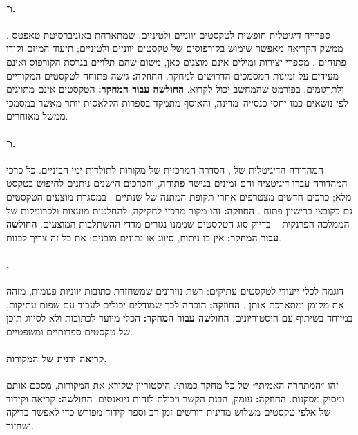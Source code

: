 \paragraph{ ו־.} ספרייה דיגיטלית חופשית לטקסטים יווניים ולטיניים, שמתארחת באוניברסיטת טאפטס \cite{perseus_scaife}. ממשק הקריאה  מאפשר שימוש בקורפוסים של טקסטים יווניים ולטיניים; תיעוד המיזם וקודו פתוחים \cite{scaife_repository}. מספרי יצירות ומילים אינם מוצגים כאן, משום שהם תלויים בגרסת הקורפוס ואינם מעידים על זמינות המסמכים הדרושים למחקר. \textbf{החוזקה:} גישה פתוחה לטקסטים המקוריים ולתרגומים, בפורמט שהמחשב יכול לקרוא. \textbf{החולשה עבור המחקר:} הטקסטים אינם מתויגים לפי נושאים כמו יחסי כנסייה–מדינה, והאוסף מתמקד בספרות הקלאסית יותר מאשר במסמכי ממשל מאוחרים.

\paragraph{ ו־.} המהדורה הדיגיטלית של , הסדרה המרכזית של מקורות לתולדות ימי הביניים. כל כרכי המהדורה עברו דיגיטציה והם זמינים בגישה פתוחה, והכרכים הישנים ניתנים לחיפוש בטקסט מלא; כרכים חדשים מצטרפים אחרי תקופת המתנה של שנתיים \cite{mgh_dmgh}. במסגרת  מוצעים הטקסטים גם כקובצי  ברישיון פתוח \cite{mgh_openmgh}. \textbf{החוזקה:} זהו מקור מרכזי לחקיקה, להחלטות מועצות ולכרוניקות של הממלכה הפרנקית – בדיוק סוג הטקסטים שממנו נגזרים מדדי ההשתלבות המוצעים. \textbf{החולשה עבור המחקר:} אין בו ניתוח, סיווג או נתונים מובנים; את כל זה צריך לבנות.

\paragraph{.} דוגמה לכלי  ייעודי לטקסטים עתיקים: רשת נוירונים שמשחזרת כתובות יווניות פגומות, מזהה את מקומן ומתארכת אותן \cite{assael2022ithaca}. \textbf{החוזקה:} הוכחה לכך שמודלים יכולים לעבוד עם שפות עתיקות, במיוחד בשיתוף עם היסטוריונים. \textbf{החולשה עבור המחקר:} הכלי מיועד לכתובות ולא לסיווג תוכן של טקסטים ספרותיים ומשפטיים.

\paragraph{קריאה ידנית של המקורות.} זהו ״המתחרה האמיתי״ של כל מחקר כמותי: היסטוריון שקורא את המקורות, מסכם אותם ומסיק מסקנות. \textbf{החוזקה:} עומק, הבנת הקשר ויכולת לזהות ניואנסים. \textbf{החולשה:} קריאה וקידוד של אלפי טקסטים משלוש מדינות דורשים זמן רב וספר קידוד מפורש כדי לאפשר בדיקה ושחזור.

